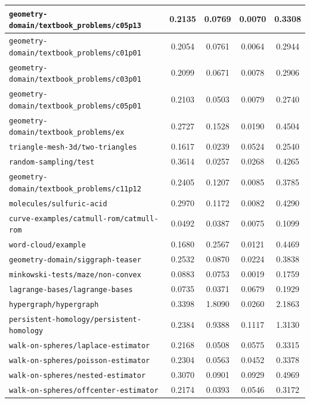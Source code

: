 \begin{longtable}{|p{6.5cm}|c|c|c|c|}
    \texttt{geometry-domain/textbook\_problems/c05p13} & 0.2135 & 0.0769 & 0.0070 & 0.3308 \\ \hline
    \texttt{geometry-domain/textbook\_problems/c01p01} & 0.2054 & 0.0761 & 0.0064 & 0.2944 \\ \hline
    \texttt{geometry-domain/textbook\_problems/c03p01} & 0.2099 & 0.0671 & 0.0078 & 0.2906 \\ \hline
    \texttt{geometry-domain/textbook\_problems/c05p01} & 0.2103 & 0.0503 & 0.0079 & 0.2740 \\ \hline
    \texttt{geometry-domain/textbook\_problems/ex} & 0.2727 & 0.1528 & 0.0190 & 0.4504 \\ \hline
    \texttt{triangle-mesh-3d/two-triangles} & 0.1617 & 0.0239 & 0.0524 & 0.2540 \\ \hline
    \texttt{random-sampling/test} & 0.3614 & 0.0257 & 0.0268 & 0.4265 \\ \hline
    \texttt{geometry-domain/textbook\_problems/c11p12} & 0.2405 & 0.1207 & 0.0085 & 0.3785 \\ \hline
    \texttt{molecules/sulfuric-acid} & 0.2970 & 0.1172 & 0.0082 & 0.4290 \\ \hline
    \texttt{curve-examples/catmull-rom/catmull-rom} & 0.0492 & 0.0387 & 0.0075 & 0.1099 \\ \hline
    \texttt{word-cloud/example} & 0.1680 & 0.2567 & 0.0121 & 0.4469 \\ \hline
    \texttt{geometry-domain/siggraph-teaser} & 0.2532 & 0.0870 & 0.0224 & 0.3838 \\ \hline
    \texttt{minkowski-tests/maze/non-convex} & 0.0883 & 0.0753 & 0.0019 & 0.1759 \\ \hline
    \texttt{lagrange-bases/lagrange-bases} & 0.0735 & 0.0371 & 0.0679 & 0.1929 \\ \hline
    \texttt{hypergraph/hypergraph} & 0.3398 & 1.8090 & 0.0260 & 2.1863 \\ \hline
    \texttt{persistent-homology/persistent-homology} & 0.2384 & 0.9388 & 0.1117 & 1.3130 \\ \hline
    \texttt{walk-on-spheres/laplace-estimator} & 0.2168 & 0.0508 & 0.0575 & 0.3315 \\ \hline
    \texttt{walk-on-spheres/poisson-estimator} & 0.2304 & 0.0563 & 0.0452 & 0.3378 \\ \hline
    \texttt{walk-on-spheres/nested-estimator} & 0.3070 & 0.0901 & 0.0929 & 0.4969 \\ \hline
    \texttt{walk-on-spheres/offcenter-estimator} & 0.2174 & 0.0393 & 0.0546 & 0.3172 \\ \hline

\end{longtable}
